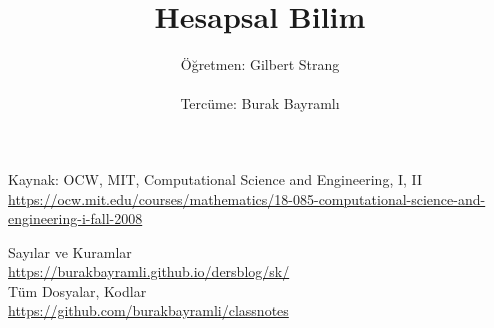 \documentclass[12pt,a4paper]{report}
\title{Hesapsal Bilim}
\author{Öğretmen: Gilbert Strang \\ \\ Tercüme: Burak Bayramlı}
\date{}
\begin{document}
\maketitle

\newpage

\begin{figure}[!hbp]
\end{figure}

\begin{center}

\vspace*{3cm}
Kaynak: OCW, MIT, Computational Science and Engineering, I, II\\
\vspace{0.5cm}
\url{https://ocw.mit.edu/courses/mathematics/18-085-computational-science-and-engineering-i-fall-2008} %
\vspace{0.5cm}

Sayılar ve Kuramlar\\
\vspace{0.5cm}
\url{https://burakbayramli.github.io/dersblog/sk/}\\
\vspace{0.5cm}
Tüm Dosyalar, Kodlar\\
\vspace{0.5cm}
\url{https://github.com/burakbayramli/classnotes}\\
\end{center}
\end{document}
